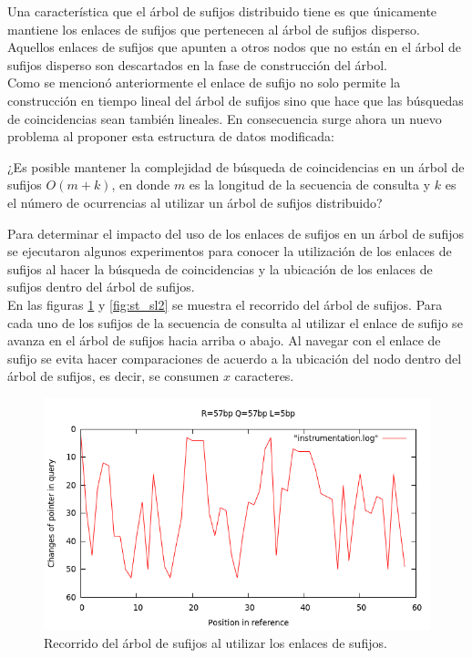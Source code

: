 \documentclass[11pt,a4paper,english]{article}
\begin{document}
Una característica que el árbol de sufijos distribuido tiene es que únicamente mantiene los enlaces de sufijos que pertenecen al 
árbol de sufijos disperso. Aquellos enlaces de sufijos que apunten a otros nodos que no están en el árbol de sufijos disperso
son descartados en la fase de construcción del árbol.\\
Como se mencionó anteriormente el enlace de sufijo no solo permite la construcción en tiempo lineal del árbol de sufijos sino
que hace que las búsquedas de coincidencias sean tambi\'en lineales. En consecuencia surge ahora un nuevo problema al proponer
esta estructura de datos modificada:\\
\begin{center}
  ¿Es posible mantener la complejidad de búsqueda de coincidencias en un árbol de sufijos $O(m+k)$, en donde $m$ es la
  longitud de la secuencia de consulta y $k$ es el número de ocurrencias al utilizar un árbol de sufijos distribuido?
\end{center}
Para determinar el impacto del uso de los enlaces de sufijos en un árbol de sufijos se ejecutaron algunos experimentos para
conocer la utilización de los enlaces de sufijos al hacer la búsqueda de coincidencias y la ubicación de los enlaces de sufijos
dentro del árbol de sufijos.\\
En las figuras \ref{fig:st_sl} y \ref{fig:st_sl2} se muestra el recorrido del árbol de sufijos. Para cada uno de los sufijos
de la secuencia de consulta al utilizar el enlace de sufijo se avanza en el árbol de sufijos hacia arriba o abajo. Al navegar
con el enlace de sufijo se evita hacer comparaciones de acuerdo a la ubicación del nodo dentro del árbol de sufijos, es decir,
se consumen $x$ caracteres.
\begin{figure}[h]
\begin{center}
\includegraphics[scale=0.4]{r57-q57-l5.png}
\caption{Recorrido del árbol de sufijos al utilizar los enlaces de sufijos.}
\label{fig:st_sl}
\end{center}
\end{figure}
\end{document}
